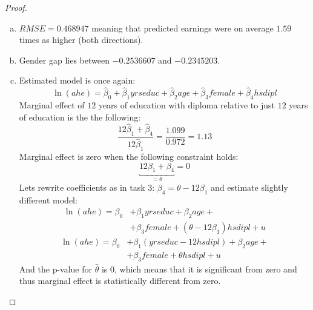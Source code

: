 \documentclass[12pt,reqno]{amsart}
\theoremstyle{plain}
\newcommand{\hb}{\hat\beta}
\begin{document}
\begin{proof}
\begin{enumerate}[(a)]
        \item $ RMSE = 0.468947 $ meaning that predicted earnings were on average $ 1.59 $ times
              as higher (both directions).
        \item Gender gap lies between $ -0.2536607 $ and $ -0.2345203 $.
        \item Estimated model is once again:
              \[\ln(ahe) = \hb_0 + \hb_1 yrseduc + \hb_2 age + \hb_3 female + \hb_4 hsdipl\]
              Marginal effect of $ 12 $ years of education with diploma relative to just $ 12 $ years of education
              is the the following:
              \[
                  \frac{12 \hb_1 + \hb_4}{12\hb_1} = \frac{1.099}{0.972}=1.13
              \]
              Marginal effect is zero when the following constraint holds:
              \[\underbracket{12 \beta_1 +\beta_4}_{=\theta} = 0\]
              Lets rewrite coefficients as in task 3: $ \beta_4 = \theta - 12 \beta_1  $
              and estimate slightly different model:
              \begin{align*}
                  \ln(ahe) = \beta_0 & + \beta_1 yrseduc + \beta_2 age +                   \\
                                     & + \beta_3 female + (\theta - 12 \beta_1)hsdipl  + u
              \end{align*}
              \begin{align*}
                  \ln(ahe) = \beta_0 & + \beta_1 (yrseduc - 12 hsdipl) + \beta_2 age + \\
                                     & +\beta_3 female + \theta hsdipl + u
              \end{align*}
              And the p-value for $ \hat\theta $ is 0, which means that it is significant from zero and
              thus marginal effect is statistically different from zero.


\end{enumerate}
\end{proof}
\end{document}
